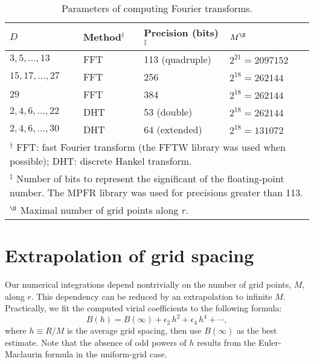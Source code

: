 \documentclass[aip,jcp,preprint,superscriptaddress,showpacs,preprintnumbers,amsmath,amssymb]{revtex4-1}
\numberwithin{equation}{section}
\begin{document}
\begin{table}
\begin{tabular}{ l l l l }
\hline
$D$
&
Method$^\dagger$
&
Precision (bits)$^\ddagger$
&
$M^\S$
\\ \hline
%
$3, 5, \dots, 13$
&
FFT
&
113 (quadruple)
&
$2^{21} = 2097152$
\\
%
$15, 17, \dots, 27$
&
FFT
&
256
&
$2^{18} = 262144$
\\
%
$29$
&
FFT
&
384
&
$2^{18} = 262144$
\\ \hline
%
$2, 4, 6, \dots, 22$
&
DHT
&
53 (double)
&
$2^{18} = 262144$
\\
%
$2, 4, 6, \dots, 30$
&
DHT
&
64 (extended)
&
$2^{18} = 131072$
\\ \hline
\multicolumn{4}{p{\linewidth}}{
$^\dagger$
FFT: fast Fourier transform\cite{press}
(the FFTW\cite{frigo2005} library was used when possible);
DHT: discrete Hankel transform\cite{
johnson1987, *lemoine1994}.
} \\
\multicolumn{4}{p{\linewidth}}{
$^\ddagger$
Number of bits to represent the significant of
the floating-point number.
The MPFR library\cite{fousse2007}
was used for precisions greater than 113.
} \\
\multicolumn{4}{p{\linewidth}}{
$^\S$
Maximal number of grid points along $r$.
} \\ \hline
%
\end{tabular}
\caption{
Parameters of computing Fourier transforms.
}
\label{tab:paramft}
\end{table}





\section{Extrapolation of grid spacing}





Our numerical integrations depend nontrivially
on the number of grid points, $M$, along $r$.
%
This dependency can be reduced
by an extrapolation to infinite $M$\cite{
adda-bedia2008a, *adda-bedia2008b}.
%
Practically, we fit the computed virial coefficients
to the following formula:
%
%
%
\begin{equation}
B(h)
=
B(\infty)
+
\epsilon_2 \, h^2
+
\epsilon_4 \, h^4
+
\cdots,
\label{eq:error_series}
\end{equation}
%
%
%
where $h \equiv R/M$
is the average grid spacing,
then use $B(\infty)$ as the best estimate.
%
Note that the absence of odd powers of $h$
results from the Euler-Maclaurin formula\cite{
arfken, whittaker}
in the uniform-grid case.
\end{document}
